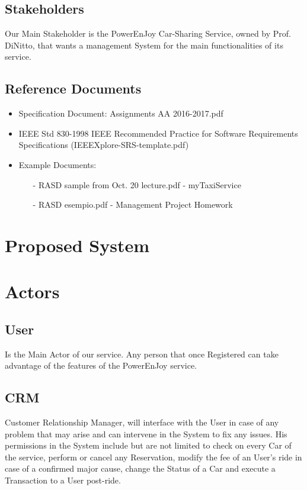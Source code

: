 \documentclass[a4paper]{article}
\begin{document}
\subsection{Stakeholders}
Our Main Stakeholder is the PowerEnJoy Car-Sharing Service, owned by Prof. DiNitto, that wants a management System for the main functionalities of its service.

\subsection{Reference Documents}
\begin{itemize}
\item Specification Document: Assignments AA 2016-2017.pdf
\item IEEE Std 830-1998 IEEE Recommended Practice for Software Requirements Specifications (IEEEXplore-SRS-template.pdf)
\item Example Documents:
\begin{itemize}
\item[-] RASD sample from Oct. 20 lecture.pdf - myTaxiService
\item[-] RASD esempio.pdf - Management Project Homework
\end{itemize}
\end{itemize}

\section{Proposed System}
\newpage

\section{Actors}
\subsection{User}
Is the Main Actor of our service. Any person that once Registered can take advantage of the features of the PowerEnJoy service.
\subsection {CRM}
Customer Relationship Manager, will interface with the User in case of any problem that may arise and can intervene in the System to fix any issues. His permissions in the System include but are not limited to check on every Car of the service, perform or cancel any Reservation, modify the fee of an User's ride in case of a confirmed major cause, change the Status of a Car and execute a Transaction to a User post-ride.
\end{document}
